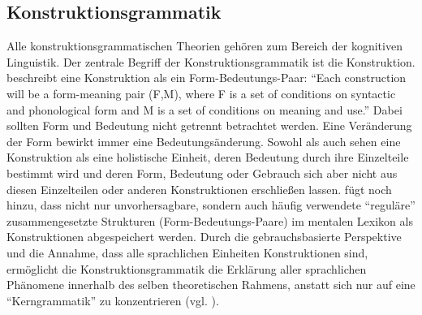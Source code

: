 


\subsection{Konstruktionsgrammatik}
Alle konstruktionsgrammatischen Theorien gehören zum Bereich der kognitiven Linguistik.
Der zentrale Begriff der Konstruktionsgrammatik ist die Konstruktion.
\cite{Lakoff87} beschreibt eine Konstruktion als ein Form-Bedeutungs-Paar:
``Each construction will be a form-meaning pair (F,M), where F is a set of conditions on syntactic and phonological form and M is a set of conditions on meaning and use.''
Dabei sollten Form und Bedeutung nicht getrennt betrachtet werden.
Eine Veränderung der Form bewirkt immer eine Bedeutungsänderung.
Sowohl \cite{Lakoff87} als auch \cite{Goldberg95} sehen eine Konstruktion als eine holistische Einheit, deren Bedeutung durch ihre Einzelteile bestimmt wird und deren Form, Bedeutung oder Gebrauch sich aber nicht aus diesen Einzelteilen oder anderen Konstruktionen erschließen lassen.
\cite{Goldberg06} fügt noch hinzu, dass nicht nur unvorhersagbare, sondern auch häufig verwendete ``reguläre'' zusammengesetzte Strukturen (Form-Bedeutungs-Paare) im mentalen Lexikon als Konstruktionen abgespeichert werden.
Durch die gebrauchsbasierte Perspektive und die Annahme, dass alle sprachlichen Einheiten Konstruktionen sind, ermöglicht die Konstruktionsgrammatik die Erklärung aller sprachlichen Phänomene innerhalb des selben theoretischen Rahmens,
anstatt sich nur auf eine ``Kerngrammatik'' zu konzentrieren (vgl. \cite{Tomasello06}).


